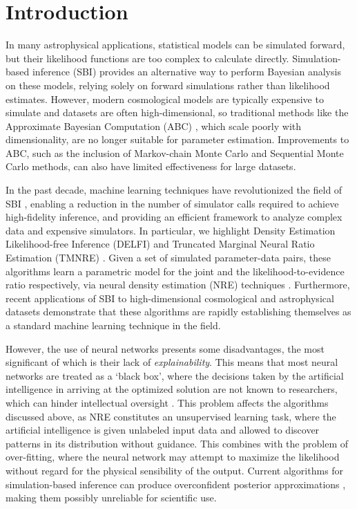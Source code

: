 \documentclass[%
 reprint,
 amsmath,amssymb,
 aps,
]{revtex4-2}
\begin{document}
\section{Introduction }\label{sec:introduction}

In many astrophysical applications, statistical models can be simulated forward, but their likelihood functions are too complex to calculate directly. Simulation-based inference (SBI)   \cite{cranmer2020frontier} provides an alternative way to perform Bayesian analysis on these models, relying solely on forward simulations rather than likelihood estimates. However, modern cosmological models are typically expensive to simulate and datasets are often high-dimensional, so traditional methods like the Approximate Bayesian Computation (ABC) \cite{rubin1984bayesianly}, which scale poorly with dimensionality, are no longer suitable for parameter estimation. Improvements to ABC, such as the inclusion of Markov-chain Monte Carlo \cite{marjoram2003markov} and Sequential Monte Carlo \cite{sisson2007sequential} methods, can also have limited effectiveness for large datasets. 

In the past decade, machine learning techniques have revolutionized the field of SBI \cite{cranmer2020frontier}, enabling a reduction in the number of simulator calls required to achieve high-fidelity inference, and providing an efficient framework to analyze complex data and expensive simulators. In particular, we highlight Density Estimation Likelihood-free Inference (DELFI) \cite{papamakarios2016fast,alsing2019fast} and Truncated Marginal Neural Ratio Estimation (TMNRE) \cite{cole2022fast}. Given a set of simulated parameter-data pairs, these algorithms learn a parametric model for the joint and the likelihood-to-evidence ratio respectively, via neural density estimation (NRE) techniques \cite{lemos2023robust,papamakarios2019neural}. Furthermore, recent applications of SBI to high-dimensional cosmological and astrophysical datasets
\cite{dupourque2023investigating, gatti2024dark, crisostomi2023neural, christy2024applying, harnois2024kids, moser2024simulation, novaes2024cosmology, fischbacher2024texttt}
demonstrate that these algorithms are rapidly establishing themselves as a standard machine learning technique in the field.

However, the use of neural networks presents some disadvantages, the most significant of which is their lack of {\it explainability}. This means that most neural networks are treated as a `black box', where the decisions taken by the artificial intelligence in arriving at the optimized solution are not known to researchers, which can hinder intellectual oversight \cite{castelvecchi2016can}. This problem affects the algorithms discussed above, as NRE constitutes an unsupervised learning task, where the artificial intelligence is given unlabeled input data and allowed to discover patterns in its distribution without guidance. This combines with the problem of over-fitting, where the neural network may attempt to maximize the likelihood without regard for the physical sensibility of the output. Current algorithms for simulation-based inference can produce overconfident posterior approximations \cite{hermans2021trust}, making them possibly unreliable for scientific use. 
\end{document}
